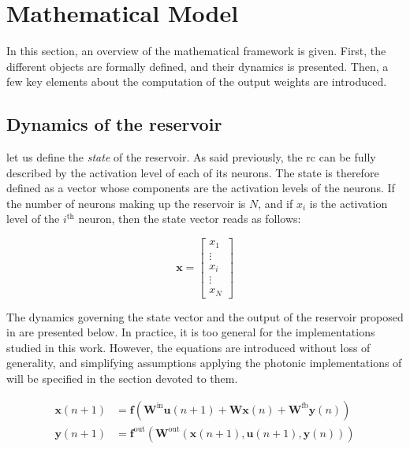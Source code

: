 
\section{Mathematical Model}

\label{rc-mathematical-model}

In this section, an overview of the mathematical framework is given. First, the different objects are formally defined, and their dynamics is presented. Then, a few key elements about the computation of the output weights are introduced.


\subsection{Dynamics of the reservoir}

let us define the \textit{state} of the reservoir. As said previously, the \gls{rc} can be fully described by the activation level of each of its neurons. The state is therefore defined as a vector whose components are the activation levels of the neurons. If the number of neurons making up the reservoir is $N$, and if $x_i$ is the activation level of the $i^{\text{th}}$ neuron, then the state vector reads as follows:

\begin{equation}
	\mathbf{x} = \begin{bmatrix}
		x_1\\
		\vdots \\
		x_i \\
		\vdots \\
		x_N
	\end{bmatrix}
\end{equation}

The dynamics governing the state vector and the output of the reservoir proposed in \cite{JaegerH.2001Tesa} are presented below. In practice, it is too general for the implementations studied in this work. However, the equations are introduced without loss of generality, and simplifying assumptions applying the photonic implementations of \rcer will be specified in the section devoted to them.

\begin{align}
	\mathbf{x}(n+1) &= \mathbf{f} \left( \mathbf{W}^{\text{in}} \mathbf{u}(n+1) + \mathbf{W} \mathbf{x}(n) + \mathbf{W}^{\text{fb}} \mathbf{y}(n) \right) \label{rc_dynamics}\\
	\mathbf{y}(n+1) &= \mathbf{f}^{\text{out}} \left( \mathbf{W}^{\text{out}} \left(\mathbf{x}(n+1), \mathbf{u}(n+1), \mathbf{y}(n)\right) \right) \label{rc_output}
\end{align}

